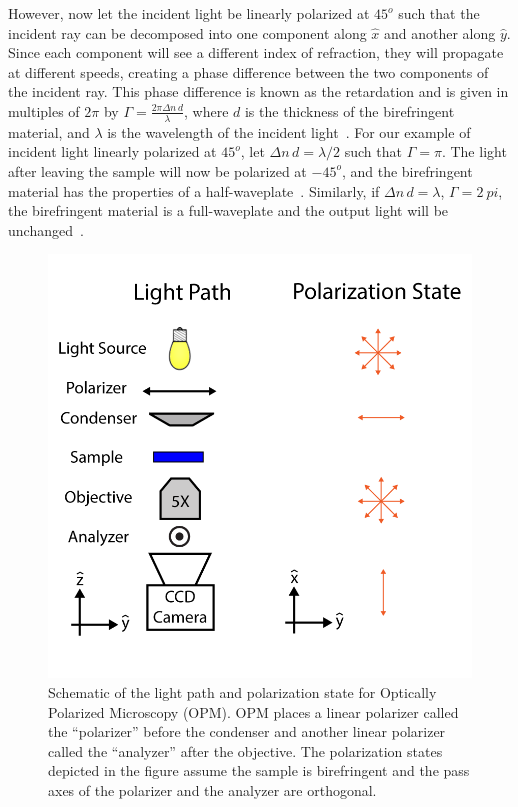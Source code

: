 However, now let the incident light be linearly polarized at $45^o$ such that the incident ray can be decomposed into one component along $\hat{x}$ and another along $\hat{y}$.
Since each component will see a different index of refraction, they will propagate at different speeds, creating a phase difference between the two components of the incident ray.
This phase difference is known as the retardation and is given in multiples of $2 \pi$ by $\Gamma = \frac{2 \pi \Delta n \, d}{\lambda}$, where $d$ is the thickness of the birefringent material, and $\lambda$ is the wavelength of the incident light~\cite{RN232}.
For our example of incident light linearly polarized at $45^o$, let $\Delta n \, d = \lambda / 2$ such that $\Gamma =  \pi$.
The light after leaving the sample will now be polarized at $-45^o$, and the birefringent material has the properties of a half-waveplate~\cite{RN232}.
Similarly, if $\Delta n \, d = \lambda$, $\Gamma =  2\ pi$, the birefringent material is a full-waveplate and the output light will be unchanged~\cite{RN232}.\\

\begin{figure}[h]
  \centering
  \includegraphics{figures/C2/Ch2-Figs_OPMSchem.png}
  \caption{Schematic of the light path and polarization state for Optically Polarized Microscopy (OPM). OPM places a linear polarizer called the ``polarizer'' before the condenser and another linear polarizer called the ``analyzer'' after the objective. The polarization states depicted in the figure assume the sample is birefringent and the pass axes of the polarizer and the analyzer are orthogonal.}\label{f:2-OPMSchem}
\end{figure}

